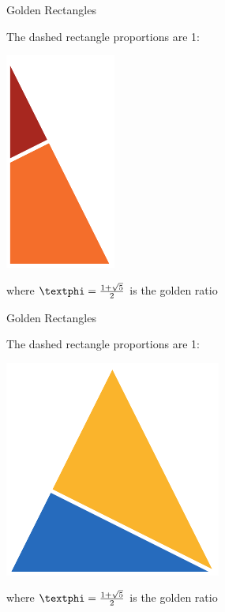 \documentclass[14pt]{beamer}
\begin{document}
    \begin{frame}{Golden Rectangles}
        \begin{center}
            The dashed rectangle proportions are 1:\textphi
        \end{center}
        \hspace{4.1em} \includegraphics[scale=1.0]{figures/figure020a.pdf} \\
        \begin{center}
            where $\text{\textphi} =\tfrac{1+\sqrt{5}}{2}$ is the golden ratio
        \end{center}
    \end{frame}


    \begin{frame}{Golden Rectangles}
        \begin{center}
            The dashed rectangle proportions are 1:\textphi
        \end{center}
        \hspace{4.1em} \includegraphics[scale=1.0]{figures/figure020e.pdf} \\
        \begin{center}
            where $\text{\textphi} =\tfrac{1+\sqrt{5}}{2}$ is the golden ratio
        \end{center}
    \end{frame}
\end{document}
